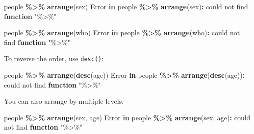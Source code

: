\documentclass[
]{book}
\newenvironment{Shaded}{\begin{snugshade}}{\end{snugshade}}
\newcommand{\ControlFlowTok}[1]{\textcolor[rgb]{0.13,0.29,0.53}{\textbf{#1}}}
\newcommand{\FunctionTok}[1]{\textcolor[rgb]{0.13,0.29,0.53}{\textbf{#1}}}
\newcommand{\NormalTok}[1]{#1}
\newcommand{\SpecialCharTok}[1]{\textcolor[rgb]{0.81,0.36,0.00}{\textbf{#1}}}
\newcommand{\StringTok}[1]{\textcolor[rgb]{0.31,0.60,0.02}{#1}}
\begin{document}
\begin{Shaded}
\begin{Highlighting}[]
\NormalTok{people }\SpecialCharTok{\%\textgreater{}\%} \FunctionTok{arrange}\NormalTok{(sex)}
\NormalTok{Error }\ControlFlowTok{in}\NormalTok{ people }\SpecialCharTok{\%\textgreater{}\%} \FunctionTok{arrange}\NormalTok{(sex)}\SpecialCharTok{:}\NormalTok{ could not find }\ControlFlowTok{function} \StringTok{"\%\textgreater{}\%"}
\end{Highlighting}
\end{Shaded}

\begin{Shaded}
\begin{Highlighting}[]
\NormalTok{people }\SpecialCharTok{\%\textgreater{}\%} \FunctionTok{arrange}\NormalTok{(who)}
\NormalTok{Error }\ControlFlowTok{in}\NormalTok{ people }\SpecialCharTok{\%\textgreater{}\%} \FunctionTok{arrange}\NormalTok{(who)}\SpecialCharTok{:}\NormalTok{ could not find }\ControlFlowTok{function} \StringTok{"\%\textgreater{}\%"}
\end{Highlighting}
\end{Shaded}

To reverse the order, use \texttt{desc()}:

\begin{Shaded}
\begin{Highlighting}[]
\NormalTok{people }\SpecialCharTok{\%\textgreater{}\%} \FunctionTok{arrange}\NormalTok{(}\FunctionTok{desc}\NormalTok{(age))}
\NormalTok{Error }\ControlFlowTok{in}\NormalTok{ people }\SpecialCharTok{\%\textgreater{}\%} \FunctionTok{arrange}\NormalTok{(}\FunctionTok{desc}\NormalTok{(age))}\SpecialCharTok{:}\NormalTok{ could not find }\ControlFlowTok{function} \StringTok{"\%\textgreater{}\%"}
\end{Highlighting}
\end{Shaded}

You can also arrange by multiple levels:

\begin{Shaded}
\begin{Highlighting}[]
\NormalTok{people }\SpecialCharTok{\%\textgreater{}\%} \FunctionTok{arrange}\NormalTok{(sex, age)}
\NormalTok{Error }\ControlFlowTok{in}\NormalTok{ people }\SpecialCharTok{\%\textgreater{}\%} \FunctionTok{arrange}\NormalTok{(sex, age)}\SpecialCharTok{:}\NormalTok{ could not find }\ControlFlowTok{function} \StringTok{"\%\textgreater{}\%"}
\end{Highlighting}
\end{Shaded}
\end{document}
